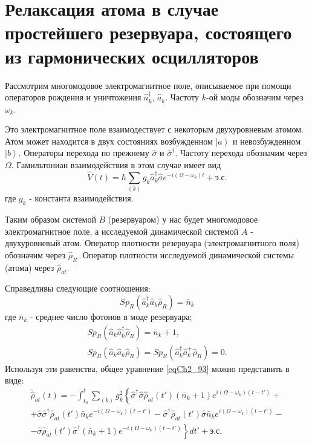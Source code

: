 \section{Релаксация атома в случае простейшего
  резервуара, состоящего из гармонических осцилляторов}
Рассмотрим многомодовое электромагнитное поле, описываемое при помощи
операторов рождения и уничтожения $\hat{a}_k^{\dag}$,
$\hat{a}_k$. Частоту $k$-ой моды обозначим через $\omega_k$. 

Это электромагнитное поле взаимодествует с некоторым двухуровневым
атомом. Атом может находится в двух состояниях 
возбужденном $\left|a\right>$ и невозбужденном
$\left|b\right>$. Операторы перехода по прежнему 
$\hat{\sigma}$ и $\hat{\sigma}^{\dag}$. Частоту перехода обозначим через
$\Omega$. Гамильтониан взаимодействия в этом случае имеет вид  
\begin{equation}
\hat{V}\left(t\right) = \hbar
\sum_{(k)} g_k \hat{a}_k^{\dag} \hat{\sigma}e^{-i \left(
\Omega - \omega_k
\right) t} +
\mbox{э.с.}
\label{eqCh2_94}
\end{equation}
где $g_k$ - константа взаимодействия.

Таким образом системой $B$ (резервуаром) у нас будет многомодовое
электромагнитное поле, а исследуемой динамической системой $A$ -
двухуровневый атом. Оператор плотности резервуара (электромагнитного
поля) обозначим через $\hat{\rho}_R$. Оператор плотности исследуемой
динамической системы (атома) через $\hat{\rho}_{at}$.

Справедливы следующие соотношения:
\begin{equation}
Sp_R\left(
\hat{a}_k^{\dag}
\hat{a}_k
\hat{\rho}_R
\right) = \bar{n}_k
\label{eqCh2_96}
\end{equation}
где $\bar{n}_k$ -
среднее число фотонов в моде резервуара; 
\begin{eqnarray}
Sp_R\left(\hat{a}_k\hat{a}_k^{\dag}\hat{\rho}_R\right) = \bar{n}_k + 1,
\nonumber \\
Sp_R\left(\hat{a}_k\hat{a}_k\hat{\rho}_R\right) = 
Sp_R\left(\hat{a}_k^{\dag}\hat{a}_k^{+}\hat{\rho}_R\right) = 0.
\label{eqCh2_96_add}
\end{eqnarray}
Используя эти равенства, общее уравнение
\eqref{eqCh2_93} можно представить в виде:  
\begin{eqnarray}
\dot{\hat{\rho}}_{at}\left(t\right) = 
- \int_{t_0}^t\sum_{(k)}g_k^2
\left\{
\hat{\sigma}^{\dag} \hat{\sigma}\hat{\rho}_{at}\left(t'\right)
\left(
\bar{n}_k + 1
\right)
e^{i\left(\Omega - \omega_k\right)
\left(t - t'\right)}
+
\right.
\nonumber \\
\left.
+\hat{\sigma}\hat{\sigma}^{\dag}
\hat{\rho}_{at}\left(t'\right)
\bar{n}_k
e^{-i\left(\Omega - \omega_k\right)
\left(t - t'\right)} -
\hat{\sigma}^{\dag}
\hat{\rho}_{at}\left(t'\right)
\hat{\sigma}
\bar{n}_k
e^{i\left(\Omega - \omega_k\right)
\left(t - t'\right)}
-
\right.
\nonumber \\
-
\left.
\hat{\sigma}
\hat{\rho}_{at}\left(t'\right)
\hat{\sigma}^{\dag}
\left(\bar{n}_k + 1\right)
e^{-i\left(\Omega - \omega_k\right)
\left(t - t'\right)}
\right\}dt'
+ \mbox{э.с.}
\label{eqCh2_97}
\end{eqnarray}

